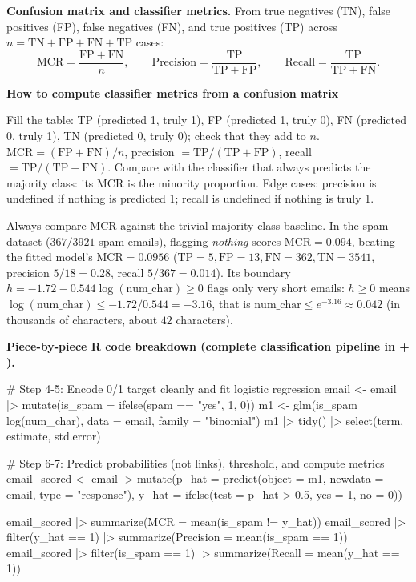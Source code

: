 \documentclass[10pt]{scrartcl}
\newenvironment{howto}[1]{\begin{mdframed}[style=howtostyle]{\color{NavyBlue}\textbf{#1}}\par\vspace{2pt}}{\end{mdframed}}
\begin{document}
\noindent\textbf{Confusion matrix and classifier metrics.} From true negatives (TN), false positives (FP), false negatives (FN), and true positives (TP) across $n = \mathrm{TN}+\mathrm{FP}+\mathrm{FN}+\mathrm{TP}$ cases:
\[
  \mathrm{MCR} = \frac{\mathrm{FP}+\mathrm{FN}}{n}, \qquad \text{Precision} = \frac{\mathrm{TP}}{\mathrm{TP}+\mathrm{FP}}, \qquad \text{Recall} = \frac{\mathrm{TP}}{\mathrm{TP}+\mathrm{FN}}.
\]
\begin{howto}{How to compute classifier metrics from a confusion matrix}
\begin{steps}
  \ii Fill the table: TP (predicted 1, truly 1), FP (predicted 1, truly 0), FN (predicted 0, truly 1), TN (predicted 0, truly 0); check that they add to $n$.
  \ii $\mathrm{MCR} = (\mathrm{FP}+\mathrm{FN})/n$, precision $= \mathrm{TP}/(\mathrm{TP}+\mathrm{FP})$, recall $= \mathrm{TP}/(\mathrm{TP}+\mathrm{FN})$.
  \ii Compare with the classifier that always predicts the majority class: its MCR is the minority proportion.
  \ii Edge cases: precision is undefined if nothing is predicted 1; recall is undefined if nothing is truly 1.
\end{steps}
\end{howto}

Always compare $\mathrm{MCR}$ against the trivial majority-class baseline. In the spam dataset ($367/3921$ spam emails), flagging \emph{nothing} scores $\mathrm{MCR} = 0.094$, beating the fitted model's $\mathrm{MCR} = 0.0956$ ($\mathrm{TP}=5, \mathrm{FP}=13, \mathrm{FN}=362, \mathrm{TN}=3541$, precision $5/18 = 0.28$, recall $5/367 = 0.014$). Its boundary $h = -1.72 - 0.544\log(\text{num\_char}) \ge 0$ flags only very short emails: $h \ge 0$ means $\log(\text{num\_char}) \le -1.72/0.544 = -3.16$, that is $\text{num\_char} \le e^{-3.16} \approx 0.042$ (in thousands of characters, about $42$ characters).

\medskip\noindent\textbf{Piece-by-piece R code breakdown (complete classification pipeline in  + ).}
\begin{rcode}
# Step 4-5: Encode 0/1 target cleanly and fit logistic regression
email <- email |> mutate(is_spam = ifelse(spam == "yes", 1, 0))
m1 <- glm(is_spam ~ log(num_char), data = email, family = "binomial")
m1 |> tidy() |> select(term, estimate, std.error)

# Step 6-7: Predict probabilities (not links), threshold, and compute metrics
email_scored <- email |>
  mutate(p_hat = predict(object = m1, newdata = email, type = "response"),
         y_hat = ifelse(test = p_hat > 0.5, yes = 1, no = 0))

email_scored |> summarize(MCR = mean(is_spam != y_hat))
email_scored |> filter(y_hat == 1)   |> summarize(Precision = mean(is_spam == 1))
email_scored |> filter(is_spam == 1) |> summarize(Recall    = mean(y_hat == 1))
\end{rcode}
\end{document}
